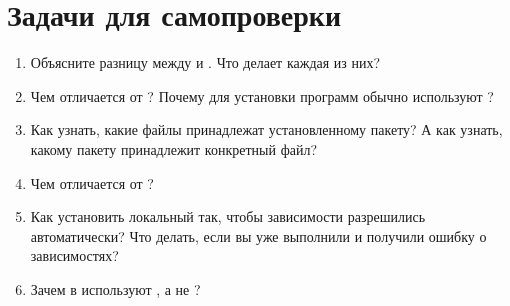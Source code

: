 \section{Задачи для самопроверки}
\begin{enumerate}
  \item Объясните разницу между  и
    . Что делает каждая из них?
  \item Чем  отличается от ? Почему для установки
    программ обычно используют ?
  \item Как узнать, какие файлы принадлежат установленному пакету?
    А как узнать, какому пакету принадлежит конкретный файл?
  \item Чем  отличается от ?
  \item Как установить локальный  так, чтобы зависимости
    разрешились автоматически? Что делать, если вы уже выполнили
     и получили ошибку о зависимостях?
  \item Зачем в  используют , а не
    ?
\end{enumerate}
